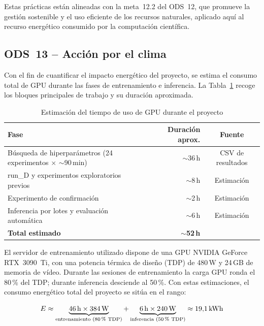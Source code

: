 \documentclass[%
    school=etsisi,%
    type=pfg,%
    degree=61CD,%
]{upm-report}
\begin{document}
Estas pr\'acticas est\'an alineadas con la meta~12.2 del ODS~12, que promueve la gesti\'on sostenible y el uso eficiente de los recursos naturales, aplicado aqu\'i al recurso energ\'etico consumido por la computaci\'on cient\'ifica.

\subsection{ODS~13 -- Acci\'on por el clima}

Con el fin de cuantificar el impacto energ\'etico del proyecto, se estima el consumo total de GPU durante las fases de entrenamiento e inferencia. La Tabla~\ref{tab:consumo-gpu} recoge los bloques principales de trabajo y su duraci\'on aproximada.

\begin{table}[htbp]
    \centering
    \caption{Estimaci\'on del tiempo de uso de GPU durante el proyecto}
    \label{tab:consumo-gpu}
    \small
    \begin{tabular}{lrc}
        \toprule
        \textbf{Fase} & \textbf{Duraci\'on aprox.} & \textbf{Fuente} \\
        \midrule
        B\'usqueda de hiperpar\'ametros (24 experimentos $\times$ ${\sim}$90\,min) & ${\sim}$36\,h & CSV de resultados \\
        run\_D y experimentos exploratorios previos                    & ${\sim}$8\,h  & Estimaci\'on \\
        Experimento de confirmaci\'on                                  & ${\sim}$2\,h  & Estimaci\'on \\
        Inferencia por lotes y evaluaci\'on autom\'atica               & ${\sim}$6\,h  & Estimaci\'on \\
        \midrule
        \textbf{Total estimado}                                        & ${\sim}$\textbf{52\,h} & \\
        \bottomrule
    \end{tabular}
\end{table}

El servidor de entrenamiento utilizado dispone de una GPU NVIDIA GeForce RTX~3090~Ti, con una potencia t\'ermica de dise\~no (TDP) de 480\,W y 24\,GB de memoria de v\'ideo. Durante las sesiones de entrenamiento la carga GPU ronda el 80\,\% del TDP; durante inferencia desciende al 50\,\%. Con estas estimaciones, el consumo energ\'etico total del proyecto se sit\'ua en el rango:

\begin{equation}
    E \approx
    \underbrace{46\,\text{h} \times 384\,\text{W}}_{\text{entrenamiento (80\,\% TDP)}}
    +
    \underbrace{6\,\text{h} \times 240\,\text{W}}_{\text{inferencia (50\,\% TDP)}}
    \approx 19{,}1\,\text{kWh}
    \label{eq:consumo}
\end{equation}
\end{document}
